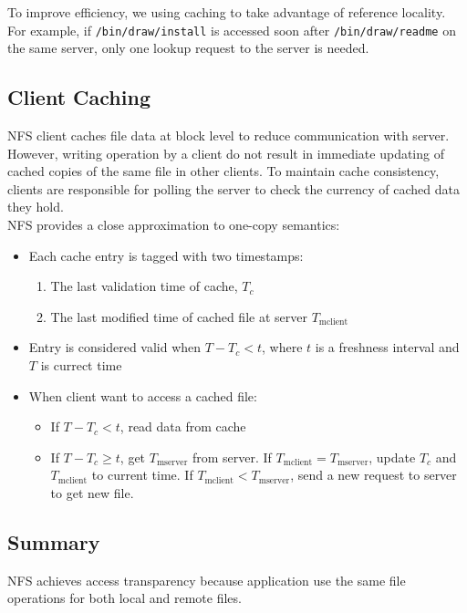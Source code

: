 \begin{multicols*}{2}
\noindent To improve efficiency, we using caching to take advantage of reference locality. For example, if \verb|/bin/draw/install| is accessed soon after \verb|/bin/draw/readme| on the same server, only one lookup request to the server is needed.

\subsection{Client Caching}

\noindent NFS client caches file data at block level to reduce communication with server. However, writing operation by a client do not result in immediate updating of cached copies of the same file in other clients. To maintain cache consistency, clients are responsible for polling the server to check the currency of cached data they hold. \\

\noindent NFS provides a close approximation to one-copy semantics:
\begin{itemize}
    \item Each cache entry is tagged with two timestamps:
    \begin{enumerate}
        \item The last validation time of cache, $T_c$
        \item The last modified time of cached file at server $T_{\text{mclient}}$
    \end{enumerate}
    \item Entry is considered valid when $T-T_c < t$, where $t$ is a freshness interval and $T$ is currect time
    \item When client want to access a cached file:
    \begin{itemize}
        \item If $T-T_c<t$, read data from cache
        \item If $T-T_c\ge t$, get $T_{\text{mserver}}$ from server. If $T_{\text{mclient}}=T_{\text{mserver}}$, update $T_c$ and $T_{\text{mclient}}$ to current time. If $T_{\text{mclient}}<T_{\text{mserver}}$, send a new request to server to get new file.
    \end{itemize}
\end{itemize}

\subsection{Summary}

\noindent NFS achieves access transparency because application use the same file operations for both local and remote files.\\


\end{multicols*}
